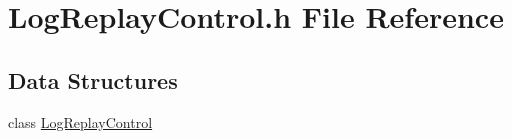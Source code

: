 \hypertarget{a00026}{\section{Log\-Replay\-Control.\-h File Reference}
\label{a00026}
}
\subsection*{Data Structures}
\begin{DoxyCompactItemize}
\item 
class \hyperlink{a00007}{Log\-Replay\-Control}
\end{DoxyCompactItemize}
